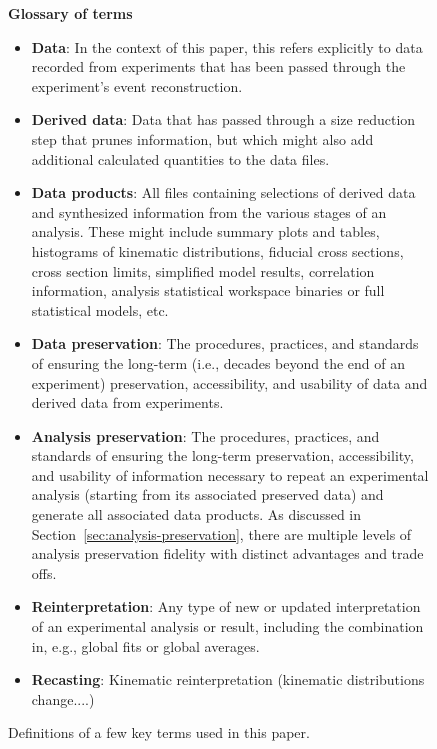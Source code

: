 \documentclass[11pt]{article}
\begin{document}
\begin{figure}[!ht]
\begin{tcolorbox}
\begin{center}
{\large \textbf{Glossary of terms}}
\end{center}
%
\begin{itemize}
    \item \textbf{Data}: In the context of this paper, this refers explicitly to data recorded from experiments that has been passed through the experiment's event reconstruction.
    \item \textbf{Derived data}: Data that has passed through a size reduction step that prunes information, but which might also add additional calculated quantities to the data files.
    \item \textbf{Data products}: All files containing selections of derived data and synthesized information from the various stages of an analysis.
These might include summary plots and tables, histograms of kinematic distributions, fiducial cross sections, cross section limits, simplified model results, correlation information, analysis statistical workspace binaries or full statistical models, etc.
    \item \textbf{Data preservation}: The procedures, practices, and standards of ensuring the long-term (i.e., decades beyond the end of an experiment) preservation, accessibility, and usability of data and derived data from experiments.
    \item \textbf{Analysis preservation}: The procedures, practices, and standards of ensuring the long-term preservation, accessibility, and usability of information necessary to repeat an experimental analysis (starting from its associated preserved data) and generate all associated data products.
    As discussed in Section~\ref{sec:analysis-preservation}, there are multiple levels of analysis preservation fidelity with distinct advantages and trade offs.
    \item \textbf{Reinterpretation}: Any type of new or updated interpretation of an experimental analysis or result, including the combination in, e.g., global fits or global averages. 
    \item \textbf{Recasting}: Kinematic reinterpretation (kinematic distributions change....) %
\end{itemize}
\end{tcolorbox}
\caption{Definitions of a few key terms used in this paper.}
\label{fig:glossary}
\end{figure}
\end{document}
